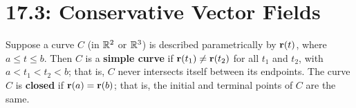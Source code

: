\documentclass[mathNotesPreamble]{subfiles}
\begin{document}
\section{17.3: Conservative Vector Fields}

  \begin{defn*}
    Suppose a curve $C$ (in $\mathbb{R}^2$ or $\mathbb{R}^3$) is described parametrically by ${\mathbf{r}}(t)$, where $a\leq t\leq b$. Then $C$ is a \textbf{simple curve} if ${\mathbf{r}}(t_1)\neq {\mathbf{r}}(t_2)$ for all $t_1$ and $t_2$, with $a<t_1<t_2<b$; that is, $C$ never intersects itself between its endpoints. The curve $C$ is \textbf{closed} if ${\mathbf{r}}(a)={\mathbf{r}}(b)$; that is, the initial and terminal points of $C$ are the same.
  \end{defn*}
\end{document}
